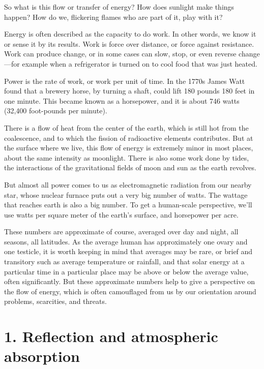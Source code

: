 \documentclass[11pt,letterpaper,twoside,onecolumn]{memoir}
\begin{document}
So what is this flow or transfer of energy? How does sunlight make things happen? How do we, flickering flames who are part of it, play with it?

Energy is often described as the capacity to do work. In other words, we know it or sense it by its results. Work is force over distance, or force against resistance. Work can produce change, or in some cases can slow, stop, or even reverse change---for example when a refrigerator is turned on to cool food that was just heated.

Power is the rate of work, or work per unit of time. In the 1770s James Watt found that a brewery horse, by turning a shaft, could lift 180 pounds 180 feet in one minute. This became known as a horsepower, and it is about 746 watts (32,400 foot-pounds per minute).

There is a flow of heat from the center of the earth, which is still hot from the coalescence, and to which the fission of radioactive elements contributes. But at the surface where we live, this flow of energy is extremely minor in most places, about the same intensity as moonlight. There is also some work done by tides, the interactions of the gravitational fields of moon and sun as the earth revolves.

But almost all power comes to us as electromagnetic radiation from our nearby star, whose nuclear furnace puts out a very big number of watts. The wattage that reaches earth is also a big number. To get a human-scale perspective, we'll use watts per square meter of the earth's surface, and horsepower per acre. 

These numbers are approximate of course, averaged over day and night, all seasons, all latitudes.\label{watts per square meter} As the average human has approximately one ovary and one testicle, it is worth keeping in mind that averages may be rare, or brief and transitory such as average temperature or rainfall, and that solar energy at a particular time in a particular place may be above or below the average value, often significantly. But these approximate numbers help to give a perspective on the flow of energy, which is often camouflaged from us by our orientation around problems, scarcities, and threats. 

\section*{1. Reflection and atmospheric absorption}
\end{document}
